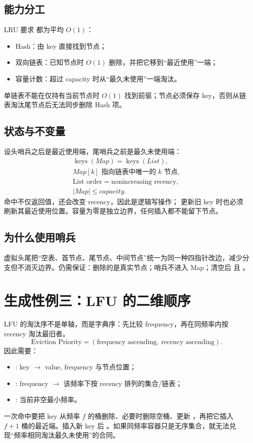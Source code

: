 \documentclass[UTF8,fontset=none,11pt,a4paper]{ctexart}
\begin{document}
\subsection{能力分工}
LRU 要求  都为平均 $O(1)$：
\begin{itemize}
  \item Hash：由 key 直接找到节点；
  \item 双向链表：已知节点时 $O(1)$ 删除，并把它移到“最近使用”一端；
  \item 容量计数：超过 capacity 时从“最久未使用”一端淘汰。
\end{itemize}
单链表不能在仅持有当前节点时 $O(1)$ 找到前驱；节点必须保存 key，否则从链表淘汰尾节点后无法同步删除 Hash 项。

\subsection{状态与不变量}
设头哨兵之后是最近使用端，尾哨兵之前是最久未使用端：
\[
\boxed{
\begin{gathered}
\operatorname{keys}(Map)=\operatorname{keys}(List),\\
Map[k]\text{ 指向链表中唯一的 }k\text{ 节点},\\
\text{List order}=\text{nonincreasing recency},\\
|Map|\le capacity.
\end{gathered}}
\]
 命中不仅返回值，还会改变 recency，因此是逻辑写操作； 更新旧 key 时也必须刷新其最近使用位置。容量为零是独立边界，任何插入都不能留下节点。

\subsection{为什么使用哨兵}
虚拟头尾把“空表、首节点、尾节点、中间节点”统一为同一种四指针改边，减少分支但不消灭边界。仍需保证：删除的是真实节点；哨兵不进入 Map；清空后  且 。

\section{生成性例三：LFU 的二维顺序}

LFU 的淘汰序不是单轴，而是字典序：先比较 frequency，再在同频率内按 recency 淘汰最旧者。
\[
\text{Eviction Priority}=(\text{frequency ascending},\ \text{recency ascending}).
\]
因此需要：
\begin{itemize}
  \item {}: key $\to$ value, frequency 与节点位置；
  \item {}: frequency $\to$ 该频率下按 recency 排列的集合/链表；
  \item {}: 当前非空最小频率。
\end{itemize}
一次命中要把 key 从频率 $f$ 的桶删除、必要时删除空桶、更新 ，再把它插入 $f+1$ 桶的最近端。插入新 key 后 。如果同频率容器只是无序集合，就无法兑现“频率相同淘汰最久未使用”的合同。
\end{document}

